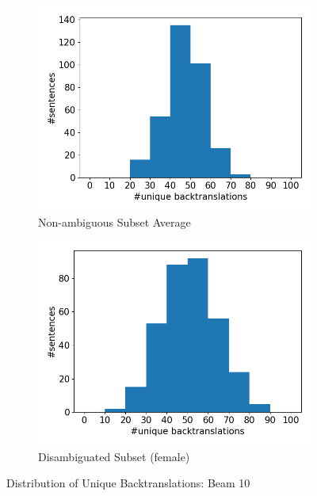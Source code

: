 \begin{figure}[!htb]
\begin{subfigure}{0.49\textwidth}
         \label{fig:uniqueness_male}
     \end{subfigure}
     \begin{subfigure}{0.49\textwidth}
         \centering
         \includegraphics[width=\textwidth]{figures/uniqueness/unique_back_average.png}
         \caption{Non-ambiguous Subset Average}
         \label{fig:uniqueness_common}
     \end{subfigure}
     \hfill
     \begin{subfigure}{0.49\textwidth}
         \centering
         \includegraphics[width=\textwidth]{figures/uniqueness/unique_back_female.png}
         \caption{Disambiguated Subset (female)}
         \label{fig:uniqueness_female}
     \end{subfigure}
        \caption{Distribution of Unique Backtranslations: Beam 10}
        \label{fig:uniqueness_graphs_10}

\end{figure}

